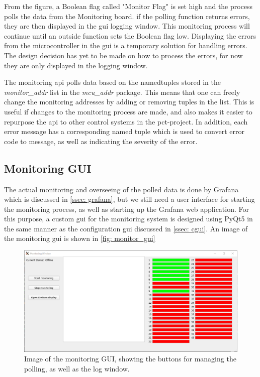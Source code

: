\documentclass[main.tex]{subfiles}
\begin{document}
From the figure, a Boolean flag called "Monitor Flag" is set high and the process polls the data from the Monitoring board. if the polling function returns errors, they are then displayed in the \gls{gui} logging window. This monitoring process will continue until an outside function sets the Boolean flag low. Displaying the errors from the microcontroller in the \gls{gui} is a temporary solution for handling errors. The design decision has yet to be made on how to process the errors, for now they are only displayed in the logging window.


The monitoring \gls{api} polls data based on the namedtuples stored in the \textit{monitor\_addr} list in the \textit{mcu\_addr} package. This means that one can freely change the monitoring addresses by adding or removing tuples in the list. This is useful if changes to the monitoring process are made, and also makes it easier to repurpose the \gls{api} to other control systems in the \gls{pct}-project. In addition, each error message has a corresponding named tuple which is used to convert error code to message, as well as indicating the severity of the error.


\subsection{Monitoring GUI}

The actual monitoring and overseeing of the polled data is done by Grafana which is discussed in \autoref{ssec: grafana}, but we still need a user interface for starting the monitoring process, as well as starting up the Grafana web application. For this purpose, a custom \gls{gui} for the monitoring system is designed using PyQt5 in the same manner as the configuration \gls{gui} discussed in \autoref{ssec: cgui}. An image of the monitoring \gls{gui} is shown in \autoref{fig: monitor_gui}

\begin{figure}[!ht]
    \centering
    \includegraphics[scale=0.6]{images/monitoring_gui.png}
    \caption{Image of the monitoring GUI, showing the buttons for managing the polling, as well as the log window.}
    \label{fig: monitor_gui}
\end{figure}
\FloatBarrier
\end{document}
